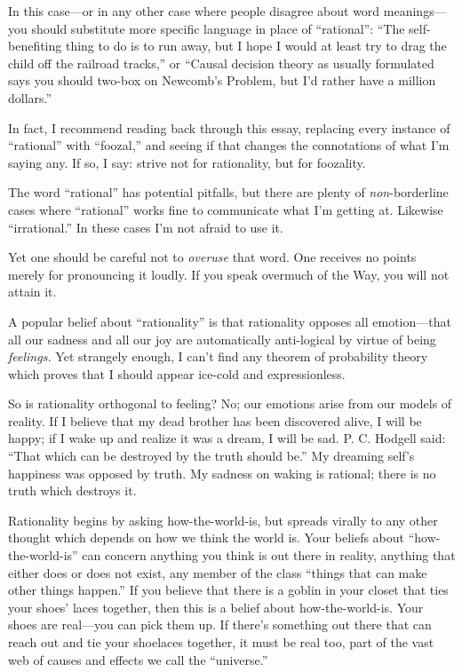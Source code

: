 {
 In this case---or in any other case where people disagree about
word meanings---you should substitute more specific language in place
of ``rational'':
``The self-benefiting thing to do is to run away, but
I hope I would at least try to drag the child off the railroad
tracks,'' or ``Causal decision
theory as usually formulated says you should two-box on
Newcomb's Problem, but I'd rather have
a million dollars.''}

{
 In fact, I recommend reading back through this essay, replacing
every instance of ``rational'' with
``foozal,'' and seeing if that
changes the connotations of what I'm saying any. If so,
I say: strive not for rationality, but for foozality.}

{
 The word ``rational'' has
potential pitfalls, but there are plenty of \textit{non}{}-borderline
cases where ``rational'' works fine
to communicate what I'm getting at. Likewise
``irrational.'' In these cases
I'm not afraid to use it.}

{
 Yet one should be careful not to \textit{overuse} that word. One
receives no points merely for pronouncing it loudly. If you speak
overmuch of the Way, you will not attain it.}

\myendsectiontext


\bigskip


{
 A popular belief about
``rationality'' is that rationality
opposes all emotion---that all our sadness and all our joy are
automatically anti-logical by virtue of being \textit{feelings.} Yet
strangely enough, I can't find any theorem of
probability theory which proves that I should appear ice-cold and
expressionless. }

{
 So is rationality orthogonal to feeling? No; our emotions arise
from our models of reality. If I believe that my dead brother has been
discovered alive, I will be happy; if I wake up and realize it was a
dream, I will be sad. P. C. Hodgell said: ``That which
can be destroyed by the truth should be.'' My
dreaming self's happiness was opposed by truth. My
sadness on waking is rational; there is no truth which destroys it.}

{
 Rationality begins by asking how-the-world-is, but spreads virally
to any other thought which depends on how we think the world is. Your
beliefs about ``how-the-world-is''
can concern anything you think is out there in reality, anything that
either does or does not exist, any member of the class
``things that can make other things
happen.'' If you believe that there is a goblin in
your closet that ties your shoes' laces together, then
this is a belief about how-the-world-is. Your shoes are real---you can
pick them up. If there's something out there that can
reach out and tie your shoelaces together, it must be real too, part of
the vast web of causes and effects we call the
``universe.''}

